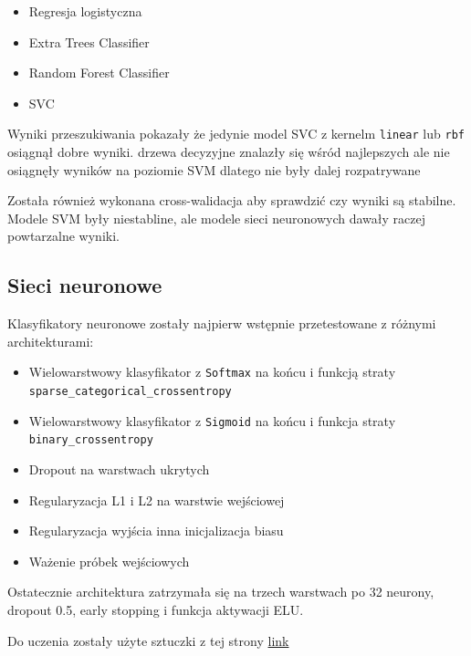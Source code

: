 \documentclass[12pt]{article}
\def\code#1{\texttt{#1}}
\begin{document}
        \begin{itemize}
            \item Regresja logistyczna
            \item Extra Trees Classifier
            \item Random Forest Classifier
            \item SVC
        \end{itemize}

        Wyniki przeszukiwania pokazały że jedynie model SVC z kernelm \code{linear} lub \code{rbf} osiągnął dobre wyniki.
        drzewa decyzyjne znalazły się wśród najlepszych ale nie osiągnęły wyników na poziomie SVM dlatego nie były dalej rozpatrywane

        Została również wykonana cross-walidacja aby sprawdzić czy wyniki są stabilne. Modele SVM były niestabline, ale 
        modele sieci neuronowych dawały raczej powtarzalne wyniki.

        \subsection{Sieci neuronowe}

        Klasyfikatory neuronowe zostały najpierw wstępnie przetestowane z różnymi architekturami:

        \begin{itemize}
            \item Wielowarstwowy klasyfikator z \code{Softmax} \newline na końcu i funkcją straty \code{sparse\_categorical\_crossentropy} 
            \item Wielowarstwowy klasyfikator z \code{Sigmoid} \newline na końcu i funkcja straty \code{binary\_crossentropy} 
            \item Dropout na warstwach ukrytych
            \item Regularyzacja L1 i L2 na warstwie wejściowej
            \item Regularyzacja wyjścia inna inicjalizacja biasu
            \item Ważenie próbek wejściowych
        \end{itemize}

        Ostatecznie architektura zatrzymała się na trzech warstwach po 32 neurony, dropout 0.5, early stopping i funkcja aktywacji ELU.

        Do uczenia zostały użyte sztuczki z tej strony \href{http://karpathy.github.io/2019/04/25/recipe/#2-set-up-the-end-to-end-trainingevaluation-skeleton--get-dumb-baselines}{link}
\end{document}
